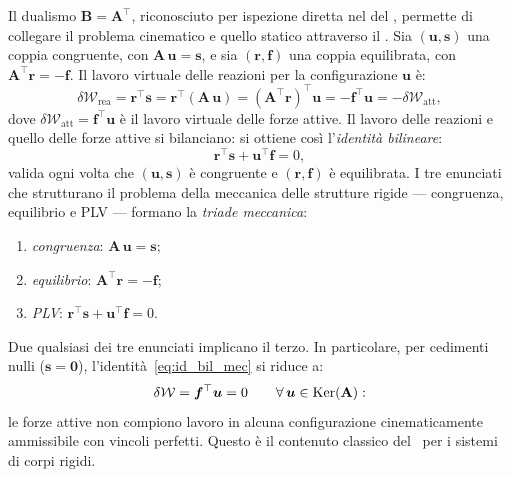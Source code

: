Il dualismo $\bm{B} = \bm{A}^{\top}$, riconosciuto per
ispezione diretta nel  del
, permette di collegare
il problema cinematico e quello statico attraverso il \PLV. Sia $(\bm{u}, \bm{s})$ una
coppia congruente, con $\bm{A}\,\bm{u} = \bm{s}$, e sia
$(\bm{r}, \bm{f})$ una coppia equilibrata, con
$\bm{A}^{\top}\bm{r} = -\bm{f}$. Il lavoro virtuale
delle reazioni per la configurazione $\bm{u}$ è:
\begin{equation}
	\delta\mathcal{W}_{\mathrm{rea}} =
	\bm{r}^{\top}\bm{s} =
	\bm{r}^{\top}(\bm{A}\,\bm{u}) =
	(\bm{A}^{\top}\bm{r})^{\top}\bm{u} =
	-\bm{f}^{\top}\bm{u} =
	-\delta\mathcal{W}_{\mathrm{att}},
\end{equation}
dove $\delta\mathcal{W}_{\mathrm{att}} = \bm{f}^{\top}\bm{u}$
è il lavoro virtuale delle forze attive. Il lavoro delle
reazioni e quello delle forze attive si bilanciano: si
ottiene così l'\emph{identità bilineare}:
\begin{equation}\label{eq:id_bil_mec}
	\boxed{\bm{r}^{\top}\bm{s} + \bm{u}^{\top}\bm{f} = 0,}
\end{equation}
valida ogni volta che $(\bm{u}, \bm{s})$ è congruente e
$(\bm{r}, \bm{f})$ è equilibrata. I tre enunciati che
strutturano il problema della meccanica delle strutture
rigide --- congruenza, equilibrio e PLV --- formano la
\emph{triade meccanica}:
\begin{enumerate}[label=(\roman*), noitemsep]
	\item \emph{congruenza}: $\bm{A}\,\bm{u} = \bm{s}$;
	\item \emph{equilibrio}: $\bm{A}^{\top}\bm{r} = -\bm{f}$;
	\item \emph{PLV}: $\bm{r}^{\top}\bm{s} +
	\bm{u}^{\top}\bm{f} = 0$.
\end{enumerate}
Due qualsiasi dei tre enunciati implicano il terzo. In
particolare, per cedimenti nulli ($\bm{s} = \bm{0}$),
l'identità~\eqref{eq:id_bil_mec} si riduce a:
\begin{equation}
	\delta\mathcal{W} =
	\bm{f}^{\top}\bm{u} = 0
	\qquad
	\forall\,\bm{u} \in \operatorname{Ker}(\mathbf{A}):
\end{equation}
le forze attive non compiono lavoro in alcuna
configurazione cinematicamente ammissibile con vincoli
perfetti. Questo è il contenuto classico del \PLV\ per
i sistemi di corpi rigidi.



